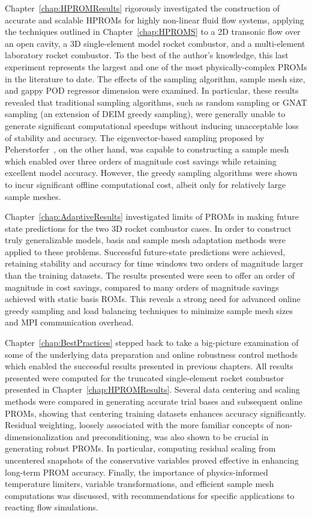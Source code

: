 Chapter~\ref{chap:HPROMResults} rigorously investigated the construction of accurate and scalable HPROMs for highly non-linear fluid flow systems, applying the techniques outlined in Chapter~\ref{chap:HPROMS} to a 2D transonic flow over an open cavity, a 3D single-element model rocket combustor, and a multi-element laboratory rocket combustor. To the best of the author's knowledge, this last experiment represents the largest and one of the most physically-complex PROMs in the literature to date. The effects of the sampling algorithm, sample mesh size, and gappy POD regressor dimension were examined. In particular, these results revealed that traditional sampling algorithms, such as random sampling or GNAT sampling (an extension of DEIM greedy sampling), were generally unable to generate significant computational speedups without inducing unacceptable loss of stability and accuracy. The eigenvector-based sampling proposed by Peherstorfer~\cite{Peherstorfer2020}, on the other hand, was capable to constructing a sample mesh which enabled over three orders of magnitude cost savings while retaining excellent model accuracy. However, the greedy sampling algorithms were shown to incur significant offline computational cost, albeit only for relatively large sample meshes.

Chapter~\ref{chap:AdaptiveResults} investigated limits of PROMs in making future state predictions for the two 3D rocket combustor cases. In order to construct truly generalizable models, basis and sample mesh adaptation methods were applied to these problems. Successful future-state predictions were achieved, retaining stability and accuracy for time windows two orders of magnitude  larger than the training datasets. The results presented were seen to offer an order of magnitude in cost savings, compared to many orders of magnitude savings achieved with static basis ROMs. This reveals a strong need for advanced online greedy sampling and load balancing techniques to minimize sample mesh sizes and MPI communication overhead.

Chapter~\ref{chap:BestPractices} stepped back to take a big-picture examination of some of the underlying data preparation and online robustness control methods which enabled the successful results presented in previous chapters. All results presented were computed for the truncated single-element rocket combustor presented in Chapter~\ref{chap:HPROMResults}. Several data centering and scaling methods were compared in generating accurate trial bases and subsequent online PROMs, showing that centering training datasets enhances accuracy significantly. Residual weighting, loosely associated with the more familiar concepts of non-dimensionalization and preconditioning, was also shown to be crucial in generating robust PROMs. In particular, computing residual scaling from uncentered snapshots of the conservative variables proved effective in enhancing long-term PROM accuracy. Finally, the importance of physics-informed temperature limiters, variable transformations, and efficient sample mesh computations was discussed, with recommendations for specific applications to reacting flow simulations.

